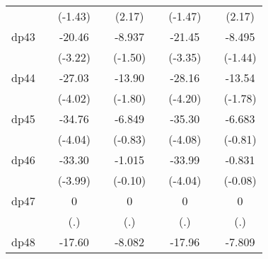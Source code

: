 {\begin{tabular}{l*{8}{c}}
            &                     &     (-1.43)         &                     &      (2.17)         &                     &     (-1.47)         &                     &      (2.17)         \\
[1em]
dp43        &                     &      -20.46\sym{**} &                     &      -8.937         &                     &      -21.45\sym{***}&                     &      -8.495         \\
            &                     &     (-3.22)         &                     &     (-1.50)         &                     &     (-3.35)         &                     &     (-1.44)         \\
[1em]
dp44        &                     &      -27.03\sym{***}&                     &      -13.90         &                     &      -28.16\sym{***}&                     &      -13.54         \\
            &                     &     (-4.02)         &                     &     (-1.80)         &                     &     (-4.20)         &                     &     (-1.78)         \\
[1em]
dp45        &                     &      -34.76\sym{***}&                     &      -6.849         &                     &      -35.30\sym{***}&                     &      -6.683         \\
            &                     &     (-4.04)         &                     &     (-0.83)         &                     &     (-4.08)         &                     &     (-0.81)         \\
[1em]
dp46        &                     &      -33.30\sym{***}&                     &      -1.015         &                     &      -33.99\sym{***}&                     &      -0.831         \\
            &                     &     (-3.99)         &                     &     (-0.10)         &                     &     (-4.04)         &                     &     (-0.08)         \\
[1em]
dp47        &                     &           0         &                     &           0         &                     &           0         &                     &           0         \\
            &                     &         (.)         &                     &         (.)         &                     &         (.)         &                     &         (.)         \\
[1em]
dp48        &                     &      -17.60\sym{***}&                     &      -8.082         &                     &      -17.96\sym{***}&                     &      -7.809         \\

\end{tabular}}
